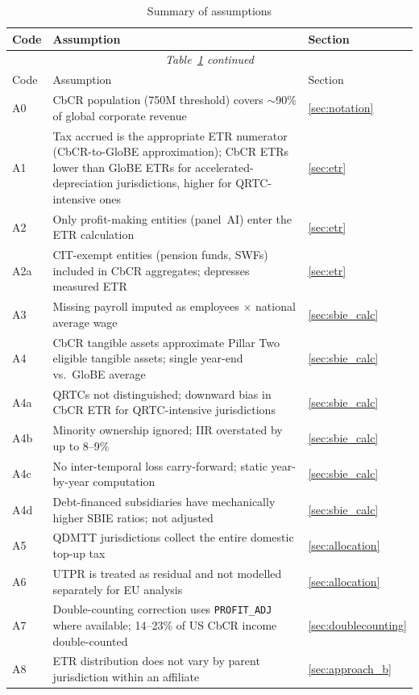 \documentclass[11pt,a4paper]{article}
\newcommand{\EUR}{\texteuro}
\newcommand{\code}[1]{\texttt{#1}}
\begin{document}
\begin{longtable}{@{}lp{10cm}l@{}}
\caption{Summary of assumptions}\label{tab:assumptions}\\
\toprule
Code & Assumption & Section \\
\midrule
\endfirsthead
\multicolumn{3}{c}{\textit{Table~\ref{tab:assumptions} continued}}\\
\toprule
Code & Assumption & Section \\
\midrule
\endhead
\bottomrule
\endlastfoot
A0 & CbCR population (\EUR750M threshold) covers $\sim$90\% of global corporate revenue & \ref{sec:notation} \\
A1 & Tax accrued is the appropriate ETR numerator (CbCR-to-GloBE approximation); CbCR ETRs lower than GloBE ETRs for accelerated-depreciation jurisdictions, higher for QRTC-intensive ones & \ref{sec:etr} \\
A2 & Only profit-making entities (panel~AI) enter the ETR calculation & \ref{sec:etr} \\
A2a & CIT-exempt entities (pension funds, SWFs) included in CbCR aggregates; depresses measured ETR & \ref{sec:etr} \\
A3 & Missing payroll imputed as employees $\times$ national average wage & \ref{sec:sbie_calc} \\
A4 & CbCR tangible assets approximate Pillar Two eligible tangible assets; single year-end vs.\ GloBE average & \ref{sec:sbie_calc} \\
A4a & QRTCs not distinguished; downward bias in CbCR ETR for QRTC-intensive jurisdictions & \ref{sec:sbie_calc} \\
A4b & Minority ownership ignored; IIR overstated by up to 8--9\% & \ref{sec:sbie_calc} \\
A4c & No inter-temporal loss carry-forward; static year-by-year computation & \ref{sec:sbie_calc} \\
A4d & Debt-financed subsidiaries have mechanically higher SBIE ratios; not adjusted & \ref{sec:sbie_calc} \\
A5 & QDMTT jurisdictions collect the entire domestic top-up tax & \ref{sec:allocation} \\
A6 & UTPR is treated as residual and not modelled separately for EU analysis & \ref{sec:allocation} \\
A7 & Double-counting correction uses \code{PROFIT\_ADJ} where available; 14--23\% of US CbCR income double-counted & \ref{sec:doublecounting} \\
A8 & ETR distribution does not vary by parent jurisdiction within an affiliate & \ref{sec:approach_b} \\

\end{longtable}
\end{document}
